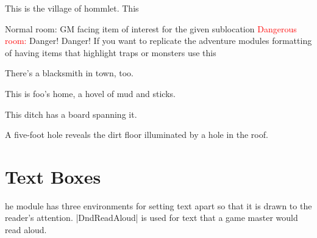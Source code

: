 \documentclass[letterpaper,openany,nodeprecatedcode]{dndbook}
\begin{document}
\begin{multicols}{2}
  This is the village of hommlet.  This 

  \begin{itemize}
    \DoDBulletGreen \textcolor{DoDGreen} {Normal room:} GM facing item of interest for the given sublocation
    \DoDBulletRed \textcolor{red} {Dangerous room:} Danger! Danger! If you want to replicate the adventure modules formatting of having items that highlight traps or monsters use this
  \end{itemize}

  There's a blacksmith in town, too.

  This is foo's home, a hovel of mud and sticks.

  This ditch has a board spanning it.

  A five-foot hole reveals the dirt floor illuminated by a hole in the roof.
\end{multicols}

\chapter{Text Boxes}

\begin{multicols}{2}
  he module has three environments for setting text apart so that it is drawn to the reader's attention. |DndReadAloud| is used for text that a game master would read aloud.
\end{multicols}
\end{document}
